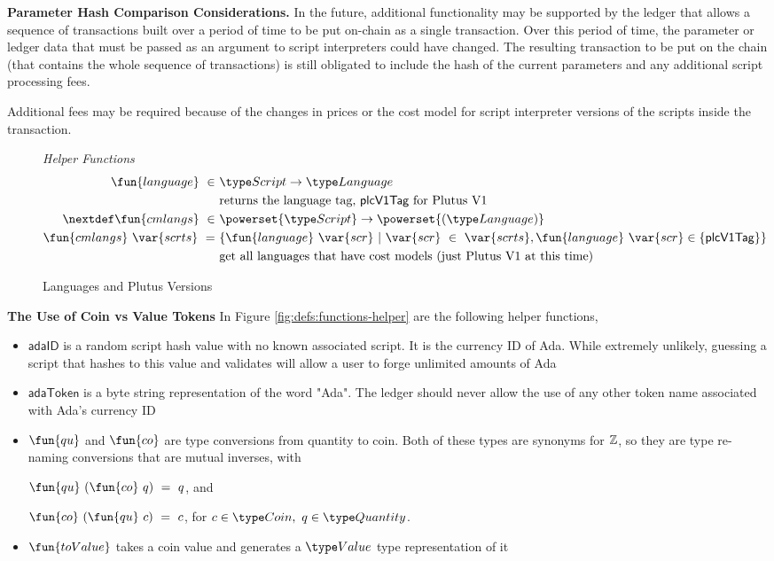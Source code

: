 \textbf{Parameter Hash Comparison Considerations.}
In the future, additional functionality may be supported by the ledger that
allows a sequence of transactions built over a period of time to be put on-chain
as a single transaction. Over this period of time, the parameter or ledger
data that must be passed as an argument to script interpreters could have changed.
The resulting transaction to be put on the chain (that contains the whole sequence of
transactions) is still obligated to include the hash of the current parameters
and any additional script processing fees.

Additional fees may be required because of the changes in prices or the cost model
for script interpreter versions of the scripts inside the transaction.

\begin{figure*}[htb]
  \emph{Helper Functions}
  \begin{align*}
    \fun{language} ~\in~& \Script \to \Language \\
    &\text{returns the language tag, $\mathsf{plcV1Tag}$ for Plutus V1} \\
    \nextdef
    \fun{cmlangs} ~\in~& \powerset{\Script} \to \powerset{(\Language)} \\
    \fun{cmlangs}~ \var{scrts} ~=~ & \{ \fun{language}~\var{scr} ~\vert~
      \var{scr}~\in~ \var{scrts}, \fun{language}~\var{scr} \in \{\mathsf{plcV1Tag} \}  \}\\
    &\text{get all languages that have cost models (just Plutus V1 at this time)} \\
  \end{align*}
  \caption{Languages and Plutus Versions}
  \label{fig:defs:functions-chain-helper}
\end{figure*}

\textbf{The Use of Coin vs Value Tokens}
In Figure \ref{fig:defs:functions-helper} are the following helper functions,

\begin{itemize}
  \item $\mathsf{adaID}$ is a random script hash value with no known associated
  script. It is the currency ID of Ada. While extremely unlikely, guessing a
  script that hashes to this value
  and validates will allow a user to forge unlimited amounts of Ada
  \item $\mathsf{adaToken}$ is a byte string representation of the word "Ada".
  The ledger should never allow the use of any other token name associated
  with Ada's currency ID
  \item $\fun{qu}$ and $\fun{co}$ are type conversions from quantity to
  coin. Both of these types are synonyms for $\mathbb{Z}$, so they are
  type re-naming conversions that are mutual inverses, with

  $\fun{qu} ~(\fun{co} ~q )~= ~q$, and

  $\fun{co}~ (\fun{qu}~ c) ~=~ c$, for $c \in \Coin,~q \in \Quantity$.

  \item $\fun{toValue}$ takes a coin value and generates a $\Value$ type representation
  of it
\end{itemize}


